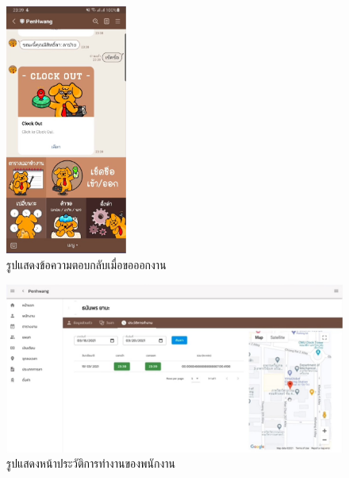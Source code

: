 \begin{figure}
  \begin{center}
    \includegraphics[width=4cm,keepaspectratio]{./images/clock_out.jpg}
  \end{center}
  \caption[รูปแสดงข้อความตอบกลับเมื่อขอออกงาน]{รูปแสดงข้อความตอบกลับเมื่อขอออกงาน} 
  \label{fig:clock_out}
\end{figure}
 
\begin{figure}
  \begin{center}
    \includegraphics[width=14cm,keepaspectratio]{./images/history.jpg}
  \end{center}
  \caption[รูปแสดงหน้าประวัติการทำงานของพนักงาน]{รูปแสดงหน้าประวัติการทำงานของพนักงาน} 
  \label{fig:history}
\end{figure}

